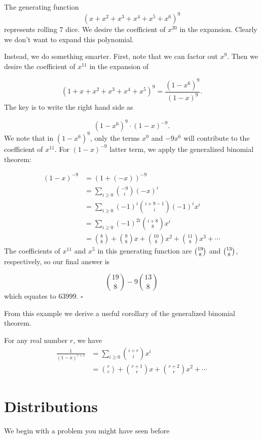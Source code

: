 \documentclass{article}
\begin{document}
\begin{sol}
The generating function \[(x+x^2+x^3+x^4+x^5+x^6)^{9}\] represents rolling $7$ dice. We desire the coefficient of $x^{20}$ in the expansion. Clearly we don't want to expand this polynomial. %

Instead, we do something smarter. First, note that we can factor out $x^9$. Then we desire the coefficient of $x^{11}$ in the expansion of

\[(1+x+x^2+x^3+x^4+x^5)^{9} = \frac{(1-x^6)^9}{(1-x)^9}.\]
The key is to write the right hand side as

\[(1-x^6)^9 \cdot (1-x)^{-9}.\]
We note that in $(1-x^6)^9$, only the terms $x^0$ and $-9x^6$ will contribute to the coefficient of $x^{11}$. For $(1-x)^{-9}$ latter term, we apply the generalized binomial theorem:

\begin{align*}
(1-x)^{-9} & = (1 + (-x))^{-9}\\
& = \sum_{i \ge 0} \binom{-9}{i} (-x)^i\\
& = \sum_{i \ge 0} (-1)^i\binom{i+9-1}{i} (-1)^ix^i\\
& = \sum_{i \ge 0} (-1)^{2i} \binom{i+8}{8} x^i\\
& = \binom{8}{8} + \binom{9}{8}x + \binom{10}{8}x^2 + \binom{11}{8}x^3 + \cdots 
\end{align*}
The coefficients of $x^{11}$ and $x^5$ in this generating function are $\tbinom{19}{8}$ and $\tbinom{13}{8}$, respectively, so our final answer is

\[\binom{19}{8} - 9\binom{13}{8}\]
which equates to $63999$. $\square$
\end{sol} 
\bigskip

From this example we derive a useful corollary of the generalized binomial theorem.

\begin{corollary}
For any real number $r$, we have
\begin{align*}
\frac{1}{(1-x)^{r+1}} & = \sum_{i\ge 0} \binom{i+r}{i}x^i\\
& = \binom{r}{r} + \binom{r+1}{r}x + \binom{r+2}{r}x^2 + \cdots
\end{align*}
\end{corollary}

\section{Distributions}
We begin with a problem you might have seen before
\end{document}
